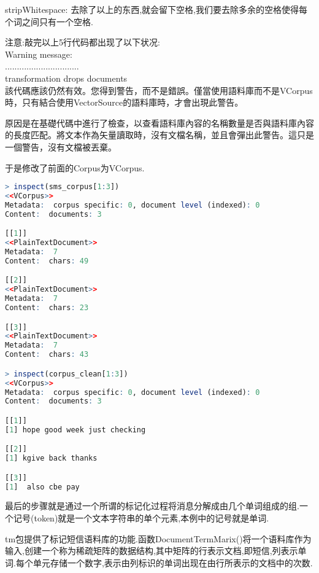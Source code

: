 \documentclass[11pt,a4paper,oneside]{book}
\begin{document}
stripWhitespace: 去除了以上的东西,就会留下空格,我们要去除多余的空格使得每个词之间只有一个空格.

\begin{tcolorbox}[colback=pink!10!white,colframe=pink!100!black]
注意:敲完以上5行代码都出现了以下状况:\\
Warning message:\\
...............................\\
transformation drops documents\\

該代碼應該仍然有效。您得到警告，而不是錯誤。僅當使用語料庫而不是VCorpus時，只有結合使用VectorSource的語料庫時，才會出現此警告。

原因是在基礎代碼中進行了檢查，以查看語料庫內容的名稱數量是否與語料庫內容的長度匹配。將文本作為矢量讀取時，沒有文檔名稱，並且會彈出此警告。這只是一個警告，沒有文檔被丟棄。

于是修改了前面的Corpus为VCorpus.
\end{tcolorbox}
\begin{lstlisting}[language=r]
> inspect(sms_corpus[1:3])
<<VCorpus>>
Metadata:  corpus specific: 0, document level (indexed): 0
Content:  documents: 3

[[1]]
<<PlainTextDocument>>
Metadata:  7
Content:  chars: 49

[[2]]
<<PlainTextDocument>>
Metadata:  7
Content:  chars: 23

[[3]]
<<PlainTextDocument>>
Metadata:  7
Content:  chars: 43

> inspect(corpus_clean[1:3])
<<VCorpus>>
Metadata:  corpus specific: 0, document level (indexed): 0
Content:  documents: 3

[[1]]
[1] hope good week just checking 

[[2]]
[1] kgive back thanks

[[3]]
[1]  also cbe pay
\end{lstlisting}

最后的步骤就是通过一个所谓的标记化过程将消息分解成由几个单词组成的组.一个记号(token)就是一个文本字符串的单个元素,本例中的记号就是单词.

tm包提供了标记短信语料库的功能.函数DocumentTermMarix()将一个语料库作为输入,创建一个称为稀疏矩阵的数据结构,其中矩阵的行表示文档,即短信,列表示单词.每个单元存储一个数字,表示由列标识的单词出现在由行所表示的文档中的次数.
\end{document}
